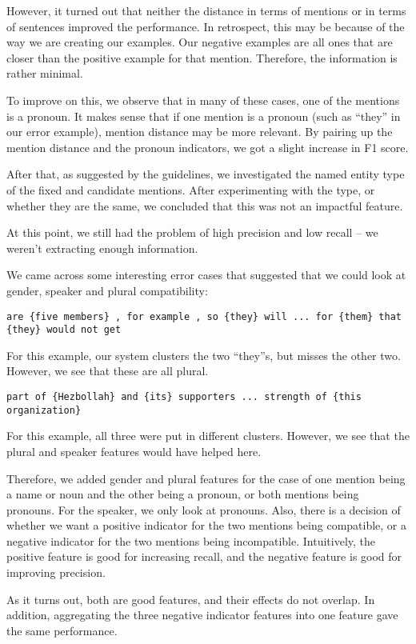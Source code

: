 \documentclass[12pt, twocolumn]{article}
\begin{document}
However, it turned out that neither the distance in terms of mentions or in terms of sentences improved the performance. In retrospect, this may be because of the way we are creating our examples. Our negative examples are all ones that are closer than the positive example for that mention. Therefore, the information is rather minimal.

To improve on this, we observe that in many of these cases, one of the mentions is a pronoun. It makes sense that if one mention is a pronoun (such as ``they'' in our error example), mention distance may be more relevant. By pairing up the mention distance and the pronoun indicators, we got a slight increase in F1 score.

After that, as suggested by the guidelines, we investigated the named entity type of the fixed and candidate mentions. After experimenting with the type, or whether they are the same, we concluded that this was not an impactful feature.

At this point, we still had the problem of high precision and low recall -- we weren't extracting enough information.

We came across some interesting error cases that suggested that we could look at gender, speaker and plural compatibility:

\texttt{are \{{five members\}} , for example , so \{{they\}} will ... for \{{them\}} that \{{they\}} would not get}

For this example, our system clusters the two ``they''s, but misses the other two. However, we see that these are all plural.

\texttt{part of {\{Hezbollah\}} and {\{its}\} supporters ... strength of \{{this organization}\}}

For this example, all three were put in different clusters. However, we see that the plural and speaker features would have helped here.

Therefore, we added gender and plural features for the case of one mention being a name or noun and the other being a pronoun, or both mentions being pronouns. For the speaker, we only look at pronouns. Also, there is a decision of whether we want a positive indicator for the two mentions being compatible, or a negative indicator for the two mentions being incompatible. Intuitively, the positive feature is good for increasing recall, and the negative feature is good for improving precision.

As it turns out, both are good features, and their effects do not overlap. In addition, aggregating the three negative indicator features into one feature gave the same performance.
\end{document}
